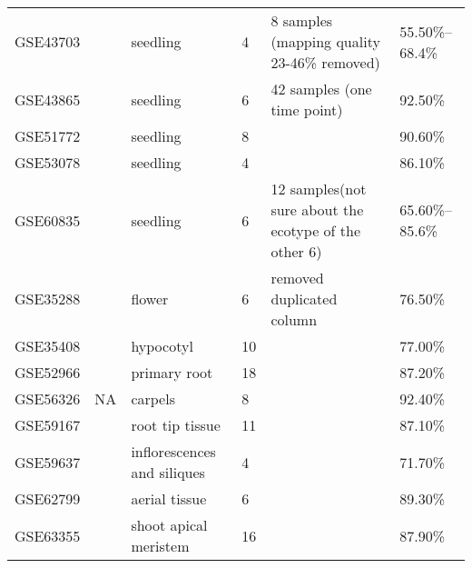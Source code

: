 \documentclass[letterpaper,12pt]{article}
\begin{document}
\begin{landscape}
\begin{table}[]
\begin{tabular}{llllp{5cm}l}
		GSE43703   & \cite{liu2013translational}          & seedling                    & 4           & 8 samples (mapping quality 23-46\% removed)           & 55.50\%--68.4\%                    \\
		GSE43865   & \cite{rugnone2013lnk}                & seedling                    & 6           & 42 samples (one time point)                           & 92.50\%                    \\
		GSE51772   & \cite{oh2014cell}                    & seedling                    & 8           &                                                       & 90.60\%                    \\
		GSE53078   & \cite{fan2014bhlh}                   & seedling                    & 4           &                                                       & 86.10\%                    \\
		GSE60835   & \cite{dong2014arabidopsis}           & seedling                    & 6           & 12 samples(not sure about the ecotype of the other 6) & 65.60\%--85.6\%                    \\  \hline
		GSE35288   & \cite{niederhuth2013transcriptional} & flower                      & 6           & removed duplicated column                             & 76.50\%                    \\
		GSE35408   & \cite{bai2012brassinosteroid}        & hypocotyl                   & 10          &                                                       & 77.00\%                       \\
		GSE52966   & \cite{chaiwanon2015spatiotemporal}   & primary root                & 18          &                                                       & 87.20\%                    \\
		GSE56326   & NA                                     & carpels                     & 8           &                                                       & 92.40\%                    \\
		GSE59167   & \cite{pallakies2014cle40}            & root tip tissue             & 11          &                                                       & 87.10\%                    \\
		GSE59637   & \cite{mizzotti2014seedstick}         & inflorescences and siliques & 4           &                                                       & 71.70\%                    \\
		GSE62799   & \cite{groth2014snf2}                 & aerial tissue               & 6           &                                                       & 89.30\%                    \\
		GSE63355   & \cite{liu2015repair}                 & shoot apical meristem       & 16          &                                                       & 87.90\%                    \\ \hline
	\end{tabular}
\end{table}
	\end{landscape}
\end{document}
